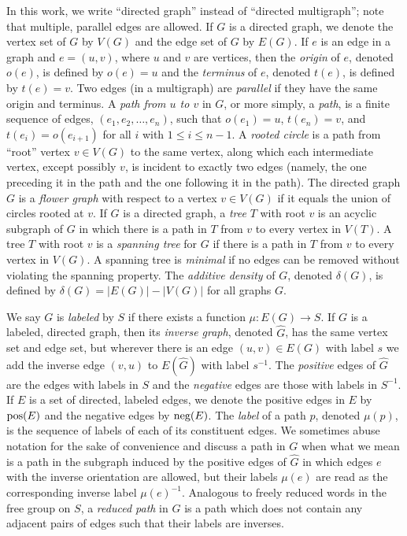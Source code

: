 \documentclass{article}
\newcommand{\pos}{\textnormal{pos}}
\newcommand{\nega}{\textnormal{neg}}
\begin{document}
In this work, we write ``directed graph'' instead of ``directed multigraph''; note that multiple, parallel edges are allowed.
If $G$ is a directed graph, we denote the vertex set of $G$ by $V(G)$ and the edge set of $G$ by $E(G)$.
If $e$ is an edge in a graph and $e = (u, v)$, where $u$ and $v$ are vertices, then the \emph{origin} of $e$, denoted $o(e)$, is defined by $o(e) = u$ and the \emph{terminus} of $e$, denoted $t(e)$, is defined by $t(e) = v$.
Two edges (in a multigraph) are \emph{parallel} if they have the same origin and terminus.
A \emph{path from $u$ to $v$} in $G$, or more simply, a \emph{path}, is a finite sequence of edges, $(e_1, e_2, \dotsc, e_n)$, such that $o(e_1) = u$, $t(e_n) = v$, and $t(e_i) = o(e_{i + 1})$ for all $i$ with $1 \leq i \leq n - 1$.
A \emph{rooted circle} is a path from ``root'' vertex $v \in V(G)$ to the same vertex, along which each intermediate vertex, except possibly $v$, is incident to exactly two edges (namely, the one preceding it in the path and the one following it in the path).
The directed graph $G$ is a \emph{flower graph} with respect to a vertex $v \in V(G)$ if it equals the union of circles rooted at $v$.
If $G$ is a directed graph, a \emph{tree} $T$ with root $v$ is an acyclic subgraph of $G$ in which there is a path in $T$ from $v$ to every vertex in $V(T)$.
A tree $T$ with root $v$ is a \emph{spanning tree} for $G$ if there is a path in $T$ from $v$ to every vertex in $V(G)$.
A spanning tree is \emph{minimal} if no edges can be removed without violating the spanning property.
The \emph{additive density} of $G$, denoted $\delta(G)$, is defined by $\delta(G) = |E(G)| - |V(G)|$ for all graphs $G$.

We say $G$ is \emph{labeled} by $S$ if there exists a function $\mu \colon E(G) \to S$.
If $G$ is a labeled, directed graph, then its \emph{inverse graph}, denoted $\hat{G}$, has the same vertex set and edge set, but wherever there is an edge $(u, v) \in E(G)$ with label $s$ we add the inverse edge $(v, u)$ to $E(\hat{G})$ with label $s^{-1}$.
The \emph{positive} edges of $\hat{G}$ are the edges with labels in $S$ and the \emph{negative} edges are those with labels in $S^{-1}$.
If $E$ is a set of directed, labeled edges, we denote the positive edges in $E$ by $\pos(E)$ and the negative edges by $\nega(E)$.
The \emph{label} of a path $p$, denoted $\mu(p)$, is the sequence of labels of each of its constituent edges.
We sometimes abuse notation for the sake of convenience and discuss a path in $G$ when what we mean is a path in the subgraph induced by the positive edges of $\hat{G}$ in which edges $e$ with the inverse orientation are allowed, but their labels $\mu(e)$ are read as the corresponding inverse label $\mu(e)^{-1}$.
Analogous to freely reduced words in the free group on $S$, a \emph{reduced path} in $G$ is a path which does not contain any adjacent pairs of edges such that their labels are inverses.
\end{document}
